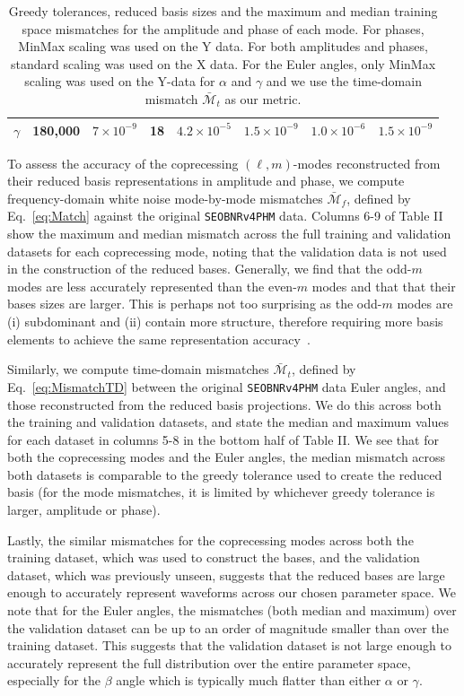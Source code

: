 \documentclass[prd,amssymb,amsmath,amsfonts,superscriptaddress,nofootinbib,reprint,showpacs, longbibliography]{revtex4-1}
\newcommand{\SEOB}{\texttt{SEOBNRv4PHM}}
\begin{document}
\begin{table}[t!]
\begin{tabular}{c|c|c|c|c|c|c|c|c}
    \multicolumn{2}{c|}{$\gamma$} & 180,000 & $7 \times 10^{-9}$ & 18 & $4.2 \times 10^{-5}$ & $1.5 \times 10^{-9}$ & $1.0\times 10^{-6}$ & $1.5 \times 10^{-9}$\\
    \hline
    \hline
    \end{tabular}
    \label{tab:ReducedBases}
    \caption{Greedy tolerances, reduced basis sizes and the maximum and median training space mismatches for the amplitude and phase of each mode.  For phases, MinMax scaling was used on the Y data. For both amplitudes and phases, standard scaling was used on the X data. For the Euler angles, only MinMax scaling was used on the Y-data for $\alpha$ and $\gamma$ and we use the time-domain mismatch $\bar{\mathcal{M}}_t$ as our metric.}
\end{table}

To assess the accuracy of the coprecessing $(\ell, m)$-modes reconstructed from their reduced basis representations in amplitude and phase, we compute frequency-domain white noise mode-by-mode mismatches $\bar{\mathcal{M}}_f$, defined by Eq.~\eqref{eq:Match} against the original \SEOB{} data. Columns 6-9 of Table II show the maximum and median mismatch across the full training and validation datasets for each coprecessing mode, noting that the validation data is not used in the construction of the reduced bases. Generally, we find that the odd-$m$ modes are less accurately represented than the even-$m$ modes and that that their bases sizes are larger. This is perhaps not too surprising as the odd-$m$ modes are (i) subdominant and (ii) contain more structure, therefore requiring more basis elements to achieve the same representation accuracy~\cite{Galley:2016}.

Similarly, we compute time-domain mismatches $\bar{\mathcal{M}}_t$, defined by Eq.~\eqref{eq:MismatchTD} between the original \SEOB{} data Euler angles, and those reconstructed from the reduced basis projections. We do this across both the training and validation datasets, and state the median and maximum values for each dataset in columns 5-8 in the bottom half of Table II. We see that for both the coprecessing modes and the Euler angles, the median mismatch across both datasets is comparable to the greedy tolerance used to create the reduced basis (for the mode mismatches, it is limited by whichever greedy tolerance is larger, amplitude or phase).

Lastly, the similar mismatches for the coprecessing modes across both the training dataset, which was used to construct the bases, and the validation dataset, which was previously unseen, suggests that the reduced bases are large enough to accurately represent waveforms across our chosen parameter space. We note that for the Euler angles, the mismatches (both median and maximum) over the validation dataset can be up to an order of magnitude smaller than over the training dataset. This suggests that the validation dataset is not large enough to accurately represent the full distribution over the entire parameter space, especially for the $\beta$ angle which is typically much flatter than either $\alpha$ or $\gamma$.
\end{document}
